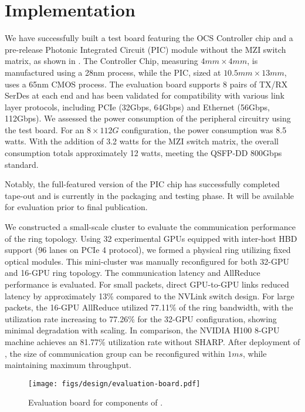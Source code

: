 \vspace{-1em}
\section{Implementation}
\label{section:implementation}


\para{\docs \xspace :}
\label{sec:testbed:docs}
We have successfully built a test board featuring the OCS Controller chip and a pre-release Photonic Integrated Circuit (PIC) module without the MZI switch matrix, as shown in . The Controller Chip, measuring $4mm \times 4mm$, is manufactured using a 28nm process, while the PIC, sized at $10.5mm \times 13mm$, uses a 65nm CMOS process. The evaluation board supports 8 pairs of TX/RX SerDes at each end and has been validated for compatibility with various link layer protocols, including PCIe (32Gbps, 64Gbps) and Ethernet (56Gbps, 112Gbps). We assessed the power consumption of the peripheral circuitry using the test board. For an $8 \times 112G$ configuration, the power consumption was 8.5 watts. With the addition of 3.2 watts for the MZI switch matrix, the overall consumption totals approximately 12 watts, meeting the QSFP-DD 800Gbps standard\cite{qsfp-dd-15w}.

Notably, the full-featured version of the PIC chip has successfully completed tape-out and is currently in the packaging and testing phase. It will be available for evaluation prior to final publication.


\label{sec:testbed:minipod}
We constructed a small-scale cluster to evaluate the communication performance of the ring topology. Using 32 experimental GPUs equipped with inter-host HBD support (96 lanes on PCIe 4 protocol), we formed a physical ring utilizing fixed optical modules. This mini-cluster was manually reconfigured for both 32-GPU and 16-GPU ring topology. The communication latency and AllReduce performance is evaluated.
For small packets, direct GPU-to-GPU links reduced latency by approximately 13\% compared to the NVLink switch design.
For large packets, the 16-GPU AllReduce utilized 77.11\% of the ring bandwidth, with the utilization rate increasing to 77.26\% for the 32-GPU configuration, showing minimal degradation with scaling. In comparison, the NVIDIA H100 8-GPU machine achieves an 81.77\% utilization rate without SHARP.
After deployment of \docs, the size of communication group can be reconfigured within $1ms$, while maintaining maximum throughput.


\begin{figure}[h!t]
    \vspace{-1em}
    \centering
    \texttt{[image: figs/design/evaluation-board.pdf]}
    \vspace{-20pt}
    \caption{Evaluation board for components of \docs.}
    \label{figure:design:evaluation-board}
    \vspace{-1em}
\end{figure}


